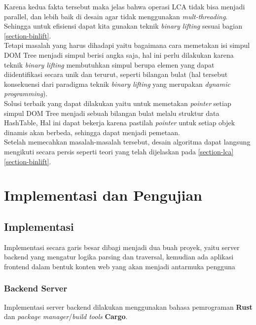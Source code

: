 \documentclass[12pt,a4paper]{article}
\begin{document}
\begin{itemize}
Karena kedua fakta tersebut maka jelas bahwa operasi LCA tidak bisa menjadi parallel, dan lebih baik di desain agar tidak menggunakan \textit{mult-threading}. 
Sehingga untuk efisiensi dapat kita gunakan teknik \textit{binary lifting} sesuai bagian \ref{section-binlift}. \\

Tetapi masalah yang harus dihadapi yaitu bagaimana cara memetakan isi simpul DOM Tree menjadi simpul berisi angka saja,
hal ini perlu dilakukan karena teknik \textit{binary lifting} membutuhkan simpul berupa elemen yang dapat diidentifikasi secara unik dan terurut, seperti bilangan bulat
(hal tersebut konsekuensi dari paradigma teknik \textit{binary lifting} yang merupakan \textit{dynamic programming}). \\

Solusi terbaik yang dapat dilakukan yaitu untuk memetakan \textit{pointer} setiap simpul DOM Tree menjadi sebuah bilangan bulat melalu struktur data HashTable,
Hal ini dapat bekerja karena pastilah \textit{pointer} untuk setiap objek dinamis akan berbeda, sehingga dapat menjadi pemetaan. \\

Setelah memecahkan masalah-masalah tersebut, desain algoritma dapat langsung mengikuti secara persis seperti teori yang telah dijelaskan pada \ref{section-lca} \ref{section-binlift}.

\pagebreak



\section{Implementasi dan Pengujian}

\subsection{Implementasi}

Implementasi secara garis besar dibagi menjadi dua buah proyek, 
yaitu server backend yang mengatur logika parsing dan traversal,
kemudian ada aplikasi frontend dalam bentuk konten web yang akan menjadi antarmuka pengguna


\subsubsection{Backend Server}

Implementasi server backend dilakukan menggunakan bahasa pemrograman \textbf{Rust} dan \textit{package manager}/\textit{build tools} \textbf{Cargo}. \\


\end{itemize}
\end{document}
